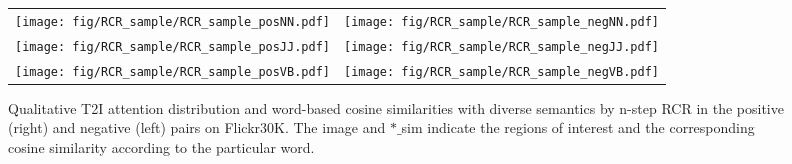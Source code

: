 \documentclass[journal]{IEEEtran}\newcommand{\ignore}[1]{}
\begin{document}
\begin{figure*}[ht]
	\centering
	\begin{tabular}{@{}cc}
		\texttt{[image: fig/RCR\_sample/RCR\_sample\_posNN.pdf]}
		&\texttt{[image: fig/RCR\_sample/RCR\_sample\_negNN.pdf]}\\
		\texttt{[image: fig/RCR\_sample/RCR\_sample\_posJJ.pdf]}
		&\texttt{[image: fig/RCR\_sample/RCR\_sample\_negJJ.pdf]}\\
		\texttt{[image: fig/RCR\_sample/RCR\_sample\_posVB.pdf]}
		&\texttt{[image: fig/RCR\_sample/RCR\_sample\_negVB.pdf]}\\
	\end{tabular}
	\caption{Qualitative T2I attention distribution and word-based cosine similarities with diverse semantics by n-step RCR in the positive (right) and negative (left) pairs on Flickr30K. The image and $*\_$sim indicate the regions of interest and the corresponding cosine similarity according to the particular word.}
	\label{fig:RCRsample}
\end{figure*}
\end{document}
